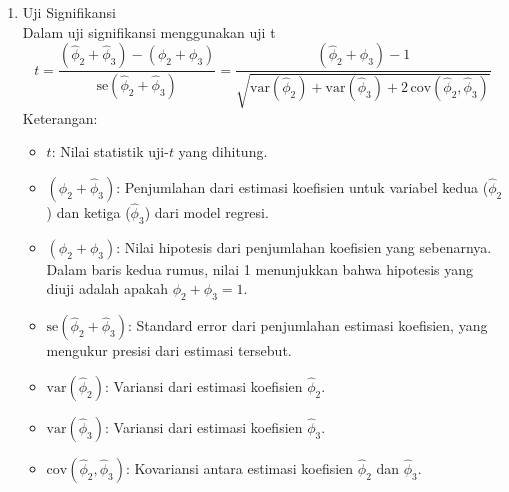 \begin{enumerate}
\begin{enumerate}[label=\alph*)]
\begin{enumerate}[label=\roman*)]
            \item Uji Signifikansi \\
            Dalam uji signifikansi menggunakan uji t
            \begin{equation}\label{st_ar_uji_signifkansi}
                t = \frac{(\hat{\phi}_2 + \hat{\phi}_3) - (\phi_2 + \phi_3)}{\text{se}(\hat{\phi}_2 + \hat{\phi}_3)}
                = \frac{(\hat{\phi}_2 + \hat{\phi}_3) - 1}{\sqrt{\text{var}(\hat{\phi}_2) + \text{var}(\hat{\phi}_3) + 2 \, \text{cov}(\hat{\phi}_2, \hat{\phi}_3)}}
            \end{equation}
            Keterangan:
            \begin{itemize}
                \item $t$: Nilai statistik uji-$t$ yang dihitung.
                \item $(\hat{\phi}_2 + \hat{\phi}_3)$: Penjumlahan dari estimasi koefisien untuk variabel kedua ($\hat{\phi}_2$) dan ketiga ($\hat{\phi}_3$) dari model regresi.
                \item $(\phi_2 + \phi_3)$: Nilai hipotesis dari penjumlahan koefisien yang sebenarnya. Dalam baris kedua rumus, nilai 1 menunjukkan bahwa hipotesis yang diuji adalah apakah $\phi_2 + \phi_3 = 1$.
                \item $\text{se}(\hat{\phi}_2 + \hat{\phi}_3)$: Standard error dari penjumlahan estimasi koefisien, yang mengukur presisi dari estimasi tersebut.
                \item $\text{var}(\hat{\phi}_2)$: Variansi dari estimasi koefisien $\hat{\phi}_2$.
                \item $\text{var}(\hat{\phi}_3)$: Variansi dari estimasi koefisien $\hat{\phi}_3$.
                \item $\text{cov}(\hat{\phi}_2, \hat{\phi}_3)$: Kovariansi antara estimasi koefisien $\hat{\phi}_2$ dan $\hat{\phi}_3$.
            \end{itemize}


\end{enumerate}
\end{enumerate}
\end{enumerate}
